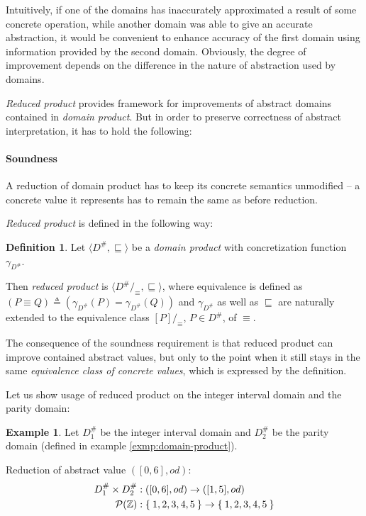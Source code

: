 \documentclass[12pt,oneside]{fithesis2}
\theoremstyle{definition}
\newtheorem{exmp}{Example}[section]
\newtheorem{definition}{Definition}
\begin{document}
Intuitively, if one of the domains has inaccurately approximated a result of some concrete operation, while another domain was able to give an accurate abstraction, it would be convenient to enhance accuracy of the first domain using information provided by the second domain. Obviously, the degree of improvement depends on the difference in the nature of abstraction used by domains.

\textit{Reduced product} provides framework for improvements of abstract domains contained in \textit{domain product}. But in order to preserve correctness of abstract interpretation, it has to hold the following:

\paragraph{Soundness}  A reduction of domain product has to keep its concrete semantics unmodified -- a concrete value it represents has to remain the same as before reduction.

\textit{Reduced product} is defined in the following way: \cite{CousotCousotMauborgne-FoSSaCS-11}

\begin{definition}
  Let $\langle D^\#, \sqsubseteq \rangle$ be a \textit{domain product} with concretization function $\gamma_{D^\#}$.

  Then \textit{reduced product} is $\langle D^\# /_\equiv, \sqsubseteq \rangle$, where equivalence is defined as  $\left(P \equiv Q \right) \triangleq \left(\gamma_{D^\#}(P) = \gamma_{D^\#}(Q) \right)$ and $\gamma_{D^\#}$ as well as $\sqsubseteq$ are naturally extended to the equivalence class $[P]/_\equiv$, $P \in D^\#$, of $\equiv$.
\end{definition}

The consequence of the soundness requirement is that reduced product can improve contained abstract values, but only to the point when it still stays in the same \textit{equivalence class of concrete values}, which is expressed by the definition.

Let us show usage of reduced product on the integer interval domain and the parity domain:

\begin{exmp}
  Let $D^\#_1$ be the integer interval domain and $D^\#_2$ be the parity domain (defined in example \ref{exmp:domain-product}).

  Reduction of abstract value $\left( [0,6], od \right)$:
  \begin{align*}
    D^\#_1 \times D^\#_2 &: \left( [0,6], od \right) \to \left([1, 5], od \right)\\
    \mathcal P(\mathbb Z) &: \Set{1,2,3,4,5} \to \Set{1,2,3,4,5}
  \end{align*}
\end{exmp}
\end{document}
